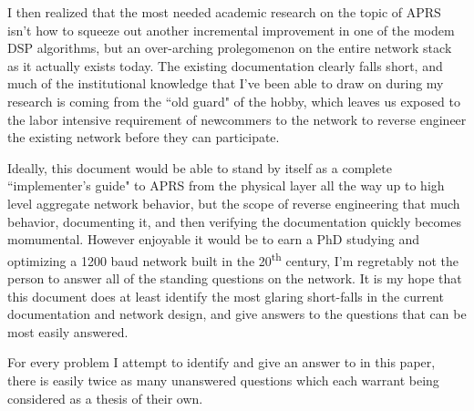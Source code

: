 I then realized that the most needed academic research on the topic of APRS isn't
how to squeeze out another incremental improvement in one of the modem DSP
algorithms, but an over-arching prolegomenon on the entire network stack as it 
actually exists today. The existing documentation clearly falls short, and 
much of the institutional knowledge that I've been able to draw on during 
my research is coming from the ``old guard" of the hobby, which leaves us exposed
to the labor intensive requirement of newcommers to the network to 
reverse engineer the existing network before they can participate.

Ideally, this document would be able to stand by itself as a complete 
``implementer's guide" to APRS from the physical layer all the way up to high level
aggregate network behavior, but the scope of reverse engineering that much
behavior, documenting it, and then verifying the documentation quickly becomes
momumental. However enjoyable it would be to earn a PhD studying and optimizing
a 1200 baud network built in the 20\textsuperscript{th} century, I'm regretably 
not the person to answer all of the standing questions on the network. 
It is my hope that this document does at least identify the most glaring 
short-falls in the current documentation and network design, and give answers to
the questions that can be most easily answered.

For every problem I attempt to identify and give an answer to in this paper, there
is easily twice as many unanswered questions which each warrant being considered 
as a thesis of their own.
